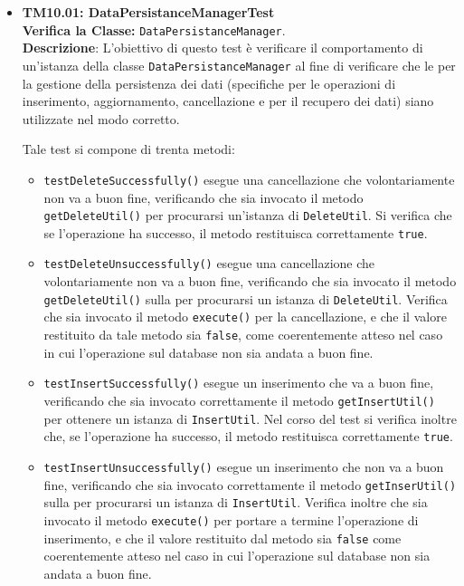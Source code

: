 \begin{itemize}

\item \textbf{TM10.01: DataPersistanceManagerTest}\\
\textbf{Verifica la Classe:} \texttt{DataPersistanceManager}.\\
\textbf{Descrizione}: L'obiettivo di questo test è verificare il comportamento di un'istanza della classe \texttt{DataPersistanceManager} al fine di verificare che le  per la gestione della persistenza dei dati (specifiche per le operazioni di inserimento, aggiornamento, cancellazione e per il recupero dei dati) siano utilizzate nel modo corretto.

Tale test si compone di trenta metodi:
\begin{itemize}

\item \texttt{testDeleteSuccessfully()} esegue una cancellazione che volontariamente non va a buon fine, verificando che sia invocato il metodo \texttt{getDeleteUtil()} per procurarsi un'istanza di \texttt{DeleteUtil}. Si verifica che se l'operazione ha successo, il metodo restituisca correttamente \texttt{true}.

\item \texttt{testDeleteUnsuccessfully()} esegue una cancellazione che volontariamente non va a buon fine, verificando che sia invocato il metodo \texttt{getDeleteUtil()} sulla  per procurarsi  un istanza di \texttt{DeleteUtil}. Verifica che sia invocato il metodo \texttt{execute()} per la cancellazione, e che il valore restituito da tale metodo sia \texttt{false}, come coerentemente atteso nel caso in cui l'operazione sul database non sia andata a buon fine.

\item \texttt{testInsertSuccessfully()} esegue un inserimento che va a buon fine, verificando che sia invocato correttamente il metodo \texttt{getInsertUtil()} per ottenere un istanza di \texttt{InsertUtil}. Nel corso del test si verifica inoltre che, se l'operazione ha successo, il metodo restituisca correttamente \texttt{true}.

\item \texttt{testInsertUnsuccessfully()} esegue un inserimento che non va a buon fine, verificando che sia invocato correttamente il metodo \texttt{getInserUtil()} sulla  per procurarsi un istanza di \texttt{InsertUtil}. Verifica inoltre che sia invocato il metodo \texttt{execute()} per portare a termine l'operazione di inserimento, e che il valore restituito dal metodo sia \texttt{false} come coerentemente atteso nel caso in cui l'operazione sul database non sia andata a buon fine.


\end{itemize}
\end{itemize}
